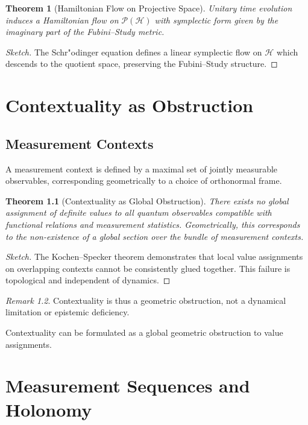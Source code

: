 \documentclass[12pt]{book}
\theoremstyle{plain}
\newtheorem{theorem}{Theorem}[chapter]
\theoremstyle{definition}
\theoremstyle{remark}
\newtheorem{remark}[theorem]{Remark}
\begin{document}
\begin{theorem}[Hamiltonian Flow on Projective Space]
Unitary time evolution induces a Hamiltonian flow on $\mathcal{P}(\mathcal{H})$ with symplectic form given by the imaginary part of the Fubini--Study metric.
\end{theorem}

\begin{proof}[Sketch]
The Schr"odinger equation defines a linear symplectic flow on $\mathcal{H}$ which descends to the quotient space, preserving the Fubini--Study structure.
\end{proof}

\chapter{Contextuality as Obstruction}

\section{Measurement Contexts}
A measurement context is defined by a maximal set of jointly measurable observables, corresponding geometrically to a choice of orthonormal frame.

\begin{theorem}[Contextuality as Global Obstruction]
There exists no global assignment of definite values to all quantum observables compatible with functional relations and measurement statistics. Geometrically, this corresponds to the non-existence of a global section over the bundle of measurement contexts.
\end{theorem}

\begin{proof}[Sketch]
The Kochen--Specker theorem demonstrates that local value assignments on overlapping contexts cannot be consistently glued together. This failure is topological and independent of dynamics.
\end{proof}

\begin{remark}
Contextuality is thus a geometric obstruction, not a dynamical limitation or epistemic deficiency.
\end{remark}
Contextuality can be formulated as a global geometric obstruction to value assignments.


\chapter{Measurement Sequences and Holonomy}
\end{document}
